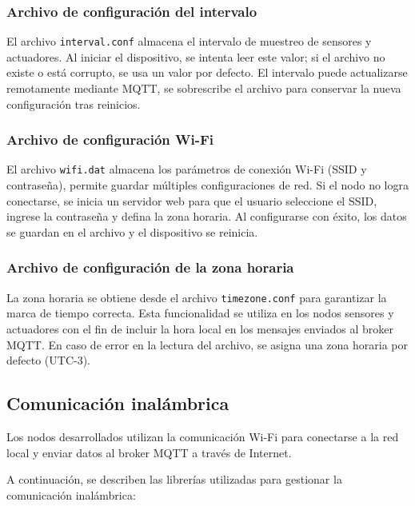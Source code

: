 \subsubsection{Archivo de configuración del intervalo}

El archivo \texttt{interval.conf} almacena el intervalo de muestreo de sensores
y actuadores. Al iniciar el dispositivo, se intenta leer este valor; si el
archivo no existe o está corrupto, se usa un valor por defecto. El intervalo
puede actualizarse remotamente mediante MQTT, se sobrescribe el archivo para
conservar la nueva configuración tras reinicios.

\subsubsection{Archivo de configuración Wi-Fi}

El archivo \texttt{wifi.dat} almacena los parámetros de conexión Wi-Fi (SSID y
contraseña), permite guardar múltiples configuraciones de red. Si el nodo no
logra conectarse, se inicia un servidor web para que el usuario seleccione el
SSID, ingrese la contraseña y defina la zona horaria. Al configurarse con
éxito, los datos se guardan en el archivo y el dispositivo se reinicia.

\subsubsection{Archivo de configuración de la zona horaria}

La zona horaria se obtiene desde el archivo \texttt{timezone.conf} para
garantizar la marca de tiempo correcta. Esta funcionalidad se utiliza en los
nodos sensores y actuadores con el fin de incluir la hora local en los mensajes
enviados al broker MQTT. En caso de error en la lectura del archivo, se asigna
una zona horaria por defecto (UTC-3).


\subsection{Comunicación inalámbrica}

Los nodos desarrollados utilizan la comunicación Wi-Fi para conectarse a la red
local y enviar datos al broker MQTT a través de Internet.

A continuación, se describen las librerías utilizadas para gestionar la
comunicación inalámbrica:

